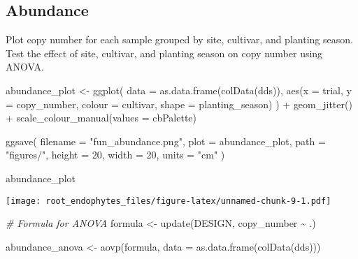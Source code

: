 \documentclass[
]{article}
\newenvironment{Shaded}{\begin{snugshade}}{\end{snugshade}}
\newcommand{\AttributeTok}[1]{\textcolor[rgb]{0.77,0.63,0.00}{#1}}
\newcommand{\CommentTok}[1]{\textcolor[rgb]{0.56,0.35,0.01}{\textit{#1}}}
\newcommand{\DecValTok}[1]{\textcolor[rgb]{0.00,0.00,0.81}{#1}}
\newcommand{\FunctionTok}[1]{\textcolor[rgb]{0.00,0.00,0.00}{#1}}
\newcommand{\NormalTok}[1]{#1}
\newcommand{\OtherTok}[1]{\textcolor[rgb]{0.56,0.35,0.01}{#1}}
\newcommand{\SpecialCharTok}[1]{\textcolor[rgb]{0.00,0.00,0.00}{#1}}
\newcommand{\StringTok}[1]{\textcolor[rgb]{0.31,0.60,0.02}{#1}}
\begin{document}
\hypertarget{abundance}{%
\subsection{Abundance}\label{abundance}}

Plot copy number for each sample grouped by site, cultivar, and planting
season. Test the effect of site, cultivar, and planting season on copy
number using ANOVA.

\begin{Shaded}
\begin{Highlighting}[]
\NormalTok{abundance\_plot }\OtherTok{\textless{}{-}} \FunctionTok{ggplot}\NormalTok{(}
  \AttributeTok{data =} \FunctionTok{as.data.frame}\NormalTok{(}\FunctionTok{colData}\NormalTok{(dds)), }
  \FunctionTok{aes}\NormalTok{(}\AttributeTok{x =}\NormalTok{ trial, }\AttributeTok{y =}\NormalTok{ copy\_number, }\AttributeTok{colour =}\NormalTok{ cultivar, }\AttributeTok{shape =}\NormalTok{ planting\_season)}
\NormalTok{) }\SpecialCharTok{+} \FunctionTok{geom\_jitter}\NormalTok{() }\SpecialCharTok{+} 
  \FunctionTok{scale\_colour\_manual}\NormalTok{(}\AttributeTok{values =}\NormalTok{ cbPalette)}

\FunctionTok{ggsave}\NormalTok{(}
  \AttributeTok{filename =} \StringTok{"fun\_abundance.png"}\NormalTok{, }\AttributeTok{plot =}\NormalTok{ abundance\_plot, }\AttributeTok{path =} \StringTok{"figures/"}\NormalTok{, }
  \AttributeTok{height =} \DecValTok{20}\NormalTok{, }\AttributeTok{width =} \DecValTok{20}\NormalTok{, }\AttributeTok{units =} \StringTok{"cm"}
\NormalTok{)}

\NormalTok{abundance\_plot}
\end{Highlighting}
\end{Shaded}

\texttt{[image: root\_endophytes\_files/figure-latex/unnamed-chunk-9-1.pdf]}

\begin{Shaded}
\begin{Highlighting}[]
\CommentTok{\# Formula for ANOVA}
\NormalTok{formula }\OtherTok{\textless{}{-}} \FunctionTok{update}\NormalTok{(DESIGN, copy\_number }\SpecialCharTok{\textasciitilde{}}\NormalTok{ .)}

\NormalTok{abundance\_anova }\OtherTok{\textless{}{-}} \FunctionTok{aovp}\NormalTok{(formula, }\AttributeTok{data =} \FunctionTok{as.data.frame}\NormalTok{(}\FunctionTok{colData}\NormalTok{(dds)))}
\end{Highlighting}
\end{Shaded}
\end{document}
